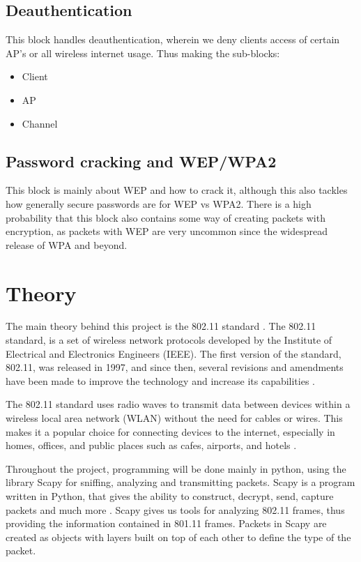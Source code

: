 \subsection{Deauthentication}
This block handles deauthentication, wherein we deny clients access of certain AP's or all wireless internet usage. Thus making the sub-blocks: 
\begin{itemize}
    \item Client
    \item AP
    \item Channel
\end{itemize}


\subsection{Password cracking and WEP/WPA2}
This block is mainly about WEP and how to crack it, although this also tackles how generally secure passwords are for WEP vs WPA2. There is a high probability that this block also contains some way of creating packets with encryption, as packets with WEP are very uncommon since the widespread release of WPA and beyond.


\section{Theory}
The main theory behind this project is the 802.11 standard \cite{IEEE802.11}. The 802.11 standard, is a set of wireless network protocols developed by the Institute of Electrical and Electronics Engineers (IEEE). The first version of the standard, 802.11, was released in 1997, and since then, several revisions and amendments have been made to improve the technology and increase its capabilities \cite{ETHW}.

The 802.11 standard uses radio waves to transmit data between devices within a wireless local area network (WLAN) without the need for cables or wires. This makes it a popular choice for connecting devices to the internet, especially in homes, offices, and public places such as cafes, airports, and hotels \cite{Public_WiFi}.

Throughout the project, programming will be done mainly in python, using the library Scapy for sniffing, analyzing and transmitting packets. Scapy is a program written in Python, that gives the ability to construct, decrypt, send, capture packets and much more \cite{IEEE_Scapy}. Scapy gives us tools for analyzing 802.11 frames, thus providing the information contained in 801.11 frames. Packets in Scapy are created as objects with layers built on top of each other to define the type of the packet.
\\

